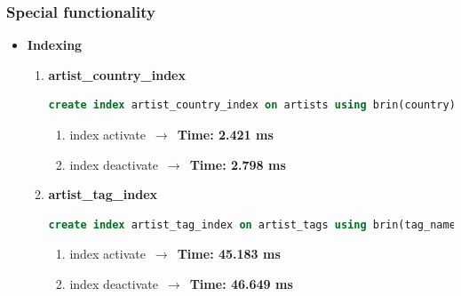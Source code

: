 \documentclass[10pt]{article}
\begin{document}
\subsubsection{Special functionality}
\begin{itemize}
    \item \textbf{Indexing}
    \begin{enumerate}
        \item \textbf{artist\_country\_index}
        \begin{lstlisting}[language=SQL,
                deletekeywords={IDENTITY,INT},
                morekeywords={clustered},    
                framesep=10pt,
                framextopmargin=10pt]
    create index artist_country_index on artists using brin(country);
            \end{lstlisting}
        \begin{enumerate}
            \textbf{Query}:
            \begin{lstlisting}[language=SQL,
                deletekeywords={IDENTITY,INT},
                morekeywords={clustered},    
                framesep=10pt,
                framextopmargin=10pt]
    select artist_name from artists where country = 'India';
            \end{lstlisting}
            \item index activate $\,\to\,$ \textbf{Time: 2.421 ms}
            \item index deactivate $\,\to\,$ \textbf{Time: 2.798 ms}
        \end{enumerate}
        \item \textbf{artist\_tag\_index}
        \begin{lstlisting}[language=SQL,
                deletekeywords={IDENTITY,INT},
                morekeywords={clustered},    
                framesep=10pt,
                framextopmargin=10pt]
    create index artist_tag_index on artist_tags using brin(tag_name);
            \end{lstlisting}
        \begin{enumerate}
            \textbf{Query}:
            \begin{lstlisting}[language=SQL,
                deletekeywords={IDENTITY,INT},
                morekeywords={clustered},    
                framesep=10pt,
                framextopmargin=10pt]
    select * from artist_tags where tag_name = 'rock';
            \end{lstlisting}
            \item index activate $\,\to\,$ \textbf{Time: 45.183 ms}
            \item index deactivate $\,\to\,$ \textbf{Time: 46.649 ms}
            

\end{enumerate}
\end{enumerate}
\end{itemize}
\end{document}
